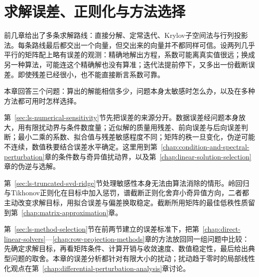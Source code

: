 \chapter{求解误差、正则化与方法选择}
\label{chap:solution-error-regularization}

前几章给出了多条求解路线：直接分解、定常迭代、Krylov子空间法与行列投影法。每条路线最后都交出一个向量，但交出来的向量并不都同样可信。设两列几乎平行的矩阵配上略有误差的观测：精确地解出方程，系数可能离真实值很远；换成另一种算法，可能连这个精确解也没有算准；迭代法提前停下，又多出一份截断误差。即使残差已经很小，也不能直接断言系数可靠。

本章回答三个问题：算出的解能相信多少，问题本身太敏感时怎么办，以及在多种方法都可用时怎样选择。

第~\ref{sec:ls-numerical-sensitivity}节先把误差的来源分开。数据误差经问题本身放大，用有限扰动界与条件数度量；近似解的质量用残差、前向误差与后向误差判断；最小二乘的系数、拟合值与残差敏感程度不同；矩阵的秩一旦变化，伪逆可能不连续，数值秩要结合误差水平确定。这里用到第~\ref{chap:condition-and-spectral-perturbation}章的条件数与奇异值扰动界，以及第~\ref{chap:linear-solution-selection}章的伪逆与选解。

第~\ref{sec:ls-truncated-svd-ridge}节处理敏感性本身无法由算法消除的情形。岭回归与Tikhonov正则化在目标中加入惩罚，谱截断正则化舍弃小奇异值方向，二者都主动改变求解目标，用拟合误差与偏差换取稳定。截断所用矩阵的最佳低秩性质留到第~\ref{chap:matrix-approximation}章。

第~\ref{sec:ls-method-selection}节在前两节建立的误差标准下，把第~\ref{chap:direct-linear-solvers}—\ref{chap:row-projection-methods}章的方法放回同一组问题中比较：先确定求解目标，再看矩阵条件、计算开销与收敛速度、数值稳定性，最后给出典型问题的取舍。本章的误差分析都针对有限大小的扰动；扰动趋于零时的局部线性化观点在第~\ref{chap:differential-perturbation-analysis}章讨论。





